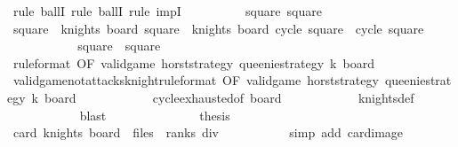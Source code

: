 \begin{isabellebody}
\ {\isacharparenleft}rule\ ballI{\isacharcomma}\ rule\ ballI{\isacharcomma}\ rule\ impI{\isacharparenright}\isanewline
\ \ \ \ \ \ \ \ \isamarkupfalse%
\ square{}\ square{}\isanewline
\ \ \ \ \ \ \ \ \isamarkupfalse%
\ {\isachardoublequoteopen}square{}\ {\isasymin}\ knights\ board{\isachardoublequoteclose}\ {\isachardoublequoteopen}square{}\ {\isasymin}\ knights\ board{\isachardoublequoteclose}\ {\isachardoublequoteopen}cycle\ square{}\ {\isacharequal}\ cycle\ square{}{\isachardoublequoteclose}\isanewline
\ \ \ \ \ \ \ \ \isamarkupfalse%
\ \isamarkupfalse%
\ {\isachardoublequoteopen}square{}\ {\isacharequal}\ square{}{\isachardoublequoteclose}\isanewline
\ \ \ \ \ \ \ \ \ \ \isamarkupfalse%
\ {}{\isacharbrackleft}rule{\isacharunderscore}format{\isacharcomma}\ OF\ {\isacharbackquoteopen}valid{\isacharunderscore}game\ horst{\isacharunderscore}strategy\ {\isacharquery}queenie{\isacharunderscore}strategy\ k\ board{\isacharbackquoteclose}{\isacharbrackright}\isanewline
\ \ \ \ \ \ \ \ \ \ \isamarkupfalse%
\ valid{\isacharunderscore}game{\isacharunderscore}not{\isacharunderscore}attacks{\isacharunderscore}knight{\isacharbrackleft}rule{\isacharunderscore}format{\isacharcomma}\ OF\ {\isacharbackquoteopen}valid{\isacharunderscore}game\ horst{\isacharunderscore}strategy\ {\isacharquery}queenie{\isacharunderscore}strategy\ k\ board{\isacharbackquoteclose}{\isacharbrackright}\isanewline
\ \ \ \ \ \ \ \ \ \ \isamarkupfalse%
\ cycle{\isacharunderscore}exhausted{\isacharbrackleft}of\ board{\isacharbrackright}\isanewline
\ \ \ \ \ \ \ \ \ \ \isamarkupfalse%
\ knights{\isacharunderscore}def\isanewline
\ \ \ \ \ \ \ \ \ \ \isamarkupfalse%
\ blast\isanewline
\ \ \ \ \ \ \isamarkupfalse%
\isanewline
\ \ \ \ \ \ \isamarkupfalse%
\ {\isacharquery}thesis\isanewline
\ \ \ \ \ \ \ \ \isamarkupfalse%
\ {\isacharbackquoteopen}card\ {\isacharparenleft}knights\ board{\isacharparenright}\ {\isachargreater}\ {\isacharparenleft}files\ {\isacharasterisk}\ ranks{\isacharparenright}\ div\ {}{\isacharbackquoteclose}\isanewline
\ \ \ \ \ \ \ \ \isamarkupfalse%
\ {\isacharparenleft}simp\ add{\isacharcolon}\ card{\isacharunderscore}image{\isacharparenright}\isanewline
\ \ \ \ \isamarkupfalse%
\isanewline
\isanewline
\ \ \ \ \isamarkupfalse%

\end{isabellebody}
